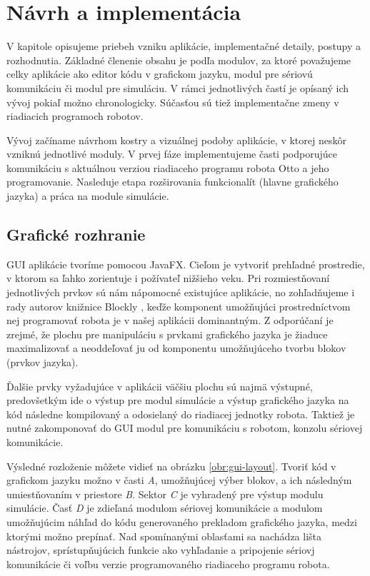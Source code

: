 \chapter{Návrh a implementácia}
\label{kap:implementacia}

V kapitole opisujeme priebeh vzniku aplikácie, implementačné detaily, postupy a rozhodnutia. Základné členenie obsahu je podľa modulov, za ktoré považujeme celky aplikácie ako editor kódu v grafickom jazyku, modul pre sériovú komunikáciu či modul pre simuláciu. V rámci jednotlivých častí je opísaný ich vývoj pokiaľ možno chronologicky. Súčasťou sú tiež implementačne zmeny v riadiacich programoch robotov.

Vývoj začíname návrhom kostry a vizuálnej podoby aplikácie, v ktorej neskôr vzniknú jednotlivé moduly. V prvej fáze implementujeme časti podporujúce komunikáciu s aktuálnou verziou riadiaceho programu robota Otto a jeho programovanie. Nasleduje etapa rozširovania funkcionalít (hlavne grafického jazyka)  a práca na module simulácie.


\section{Grafické rozhranie}
GUI aplikácie tvoríme pomocou JavaFX. Cieľom je vytvoriť prehľadné prostredie, v ktorom sa ľahko zorientuje i požívateľ nižšieho veku. Pri rozmiestňovaní jednotlivých prvkov sú nám nápomocné existujúce aplikácie, no zohľadňujeme i rady autorov knižnice Blockly \cite{blocklyBestPractices}, keďže komponent umožňujúci prostredníctvom nej programovať robota je v našej aplikácii dominantným. Z odporúčaní je zrejmé, že plochu pre manipuláciu s prvkami grafického jazyka je žiaduce maximalizovať a neoddeľovať ju od komponentu umožňujúceho tvorbu blokov (prvkov jazyka).

Ďalšie prvky vyžadujúce v aplikácii väčšiu plochu sú najmä výstupné, predovšetkým ide o výstup pre modul simulácie a výstup  grafického jazyka na kód následne kompilovaný a odosielaný do riadiacej jednotky robota. Taktiež je nutné zakomponovať do GUI modul pre komunikáciu s robotom, konzolu sériovej komunikácie.

Výsledné rozloženie môžete vidieť na obrázku \ref{obr:gui-layout}. Tvoriť kód v grafickom jazyku možno v časti \textit{A}, umožňujúcej výber blokov, a ich následným umiestňovaním v priestore \textit{B}. Sektor \textit{C} je vyhradený pre výstup modulu simulácie. Časť \textit{D} je zdieľaná modulom sériovej komunikácie a modulom umožňujúcim náhľad do kódu generovaného prekladom grafického jazyka, medzi ktorými možno prepínať. Nad spomínanými oblasťami sa nachádza lišta nástrojov, sprístupňujúcich funkcie ako vyhľadanie a pripojenie sériovj komunikácie či voľbu verzie programovaného riadiaceho programu robota.

